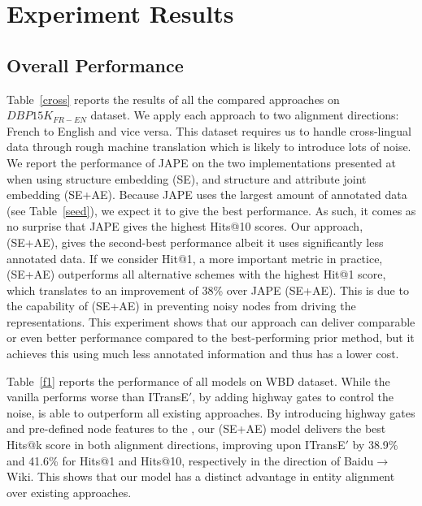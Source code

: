 \section{Experiment Results\label{sec:results}}



\subsection{Overall Performance\label{overall}}


 Table~\ref{cross} reports the results of all the compared approaches on $DBP15K_{FR-EN}$
dataset. We apply each approach
 to two alignment directions: French to English and vice versa. This dataset requires us to handle
cross-lingual data through rough machine translation which is likely to introduce lots of noise. We report the performance of JAPE on the
two implementations presented at
 ~\cite{sun2017cross} when using structure embedding (SE), and structure and attribute joint embedding (SE+AE).
Because JAPE uses the largest amount of annotated data (see Table~\ref {seed}), we expect it to give the best performance. As such, it
comes as no surprise that JAPE gives the highest Hits@10 scores. Our approach, \HRGCN (SE+AE), gives the second-best performance albeit it
uses significantly less annotated data. If we consider  Hit@1, a more important metric in practice, \HRGCN (SE+AE) outperforms all
alternative schemes with the highest Hit@1 score, which translates to an improvement of 38\% over JAPE (SE+AE). This is due to the
capability of \HRGCN (SE+AE) in preventing noisy nodes from driving the \KG representations. This experiment shows that our approach can
deliver comparable or even better performance compared to the best-performing prior method, but it achieves this using much less annotated
information and thus has a lower cost.



 Table~\ref{f1} reports the performance of all models on WBD dataset. While the vanilla \GCN performs worse than
ITransE$'$, by adding highway gates to control the noise, \HGCN is able to outperform all existing approaches. By introducing highway gates
and pre-defined node features to the \RGCN, our \HRGCN (SE+AE) model delivers the best Hits@k score in both alignment directions, improving
upon ITransE$'$ by 38.9\% and 41.6\% for Hits@1 and Hits@10, respectively in the direction of Baidu$\rightarrow$Wiki. This shows that our
model has a distinct advantage in entity alignment over existing approaches.


